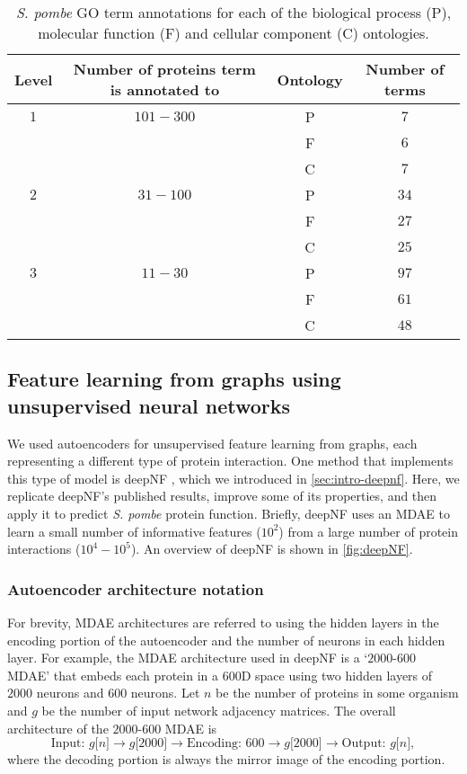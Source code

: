 \begin{table}[hbt!]
    \centering
    \caption{%
        \emph{S. pombe} GO term annotations for each of the biological process (P), molecular function (F) and cellular component (C) ontologies.
    }
    \label{table:GO}
    \begin{tabular}{cccc}
        \toprule
        \textbf{Level} & \textbf{Number of proteins term is annotated to} & \textbf{Ontology} & \textbf{Number of terms} \\
        \midrule
        $1$ & $101-300$ & P & $7$ \\
        & & F & $6$ \\
        & & C & $7$ \\
        \midrule
        $2$ & $31-100$ & P & $34$ \\
        & & F & $27$ \\
        & & C & $25$ \\
        \midrule
        $3$ & $11-30$ & P & $97$ \\
        & & F & $61$ \\
        & & C & $48$ \\
        \bottomrule
    \end{tabular}
\end{table}

\subsection{Feature learning from graphs using unsupervised neural networks}

We used autoencoders for unsupervised feature learning from graphs, each representing a different type of protein interaction.
One method that implements this type of model is deepNF \cite{Gligorijevic2018}, which we introduced in \ref{sec:intro-deepnf}.
Here, we replicate deepNF's published results, improve some of its properties, and then apply it to predict \emph{S. pombe} protein function.
Briefly, deepNF uses an MDAE to learn a small number of informative features ($10^2$) from a large number of protein interactions ($10^4 - 10^5$).
An overview of deepNF is shown in \ref{fig:deepNF}.

\subsubsection{Autoencoder architecture notation}\label{notation}

For brevity, MDAE architectures are referred to using the hidden layers in the encoding portion of the autoencoder and the number of neurons in each hidden layer.
For example, the MDAE architecture used in deepNF is a `$2000$-$600$ MDAE' that embeds each protein in a $600$D space using two hidden layers of $2000$ neurons and $600$ neurons.
Let $n$ be the number of proteins in some organism and $g$ be the number of input network adjacency matrices. The overall architecture of the $2000$-$600$ MDAE is
\[
\text{Input: }g{[}n{]} \rightarrow g{[}2000{]} \rightarrow \text{Encoding: }600 \rightarrow g{[}2000{]} \rightarrow \text{Output: }g{[}n{]},
\]
where the decoding portion is always the mirror image of the encoding portion.

